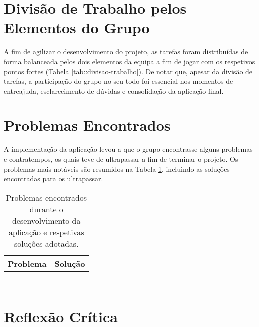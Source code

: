 \section{Divisão de Trabalho pelos Elementos do Grupo}
\label{sec::reflexao:divisao}

A fim de agilizar o desenvolvimento do projeto, as tarefas foram distribuídas de forma balanceada pelos dois elementos da equipa a fim de jogar com os respetivos pontos fortes (Tabela \ref{tab::divisao-trabalho}). De notar que, apesar da divisão de tarefas, a participação do grupo no seu todo foi essencial nos momentos de entreajuda, esclarecimento de dúvidas e consolidação da aplicação final.




\section{Problemas Encontrados}
\label{sec::reflexao:problemas}

A implementação da aplicação levou a que o grupo encontrasse alguns problemas e contratempos, os quais teve de ultrapassar a fim de terminar o projeto. Os problemas mais notáveis são resumidos na Tabela \ref{tab::problemas}, incluindo as soluções encontradas para os ultrapassar.

\begin{table}[!htbp]
	\centering
	\begin{tabular}{p{} p{}}
		\toprule
		{\bfseries Problema} & {\bfseries Solução} \\
		\midrule
		\midrule
		 &  \\
		\midrule
		 &  \\
		\midrule
		 &  \\
		\midrule
		 &  \\
		\midrule
		 &  \\
		\bottomrule
	\end{tabular}
	\caption[Problemas encontrados e respetivas soluções]{Problemas encontrados durante o desenvolvimento da aplicação e respetivas soluções adotadas.}
	\label{tab::problemas}
\end{table}



\section{Reflexão Crítica}
\label{sec::reflexao:critica}

